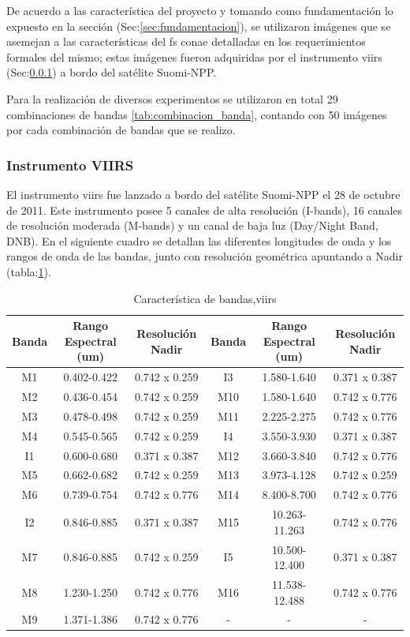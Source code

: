 De acuerdo a las característica del proyecto y tomando como fundamentación lo expuesto en la sección (Sec:\ref{sec:fundamentacion}), se utilizaron imágenes que se asemejan a las características del \ac{fs} \ac{conae} detalladas en los requerimientos formales del mismo; estas imágenes fueron adquiridas por el instrumento \ac{viirs} (Sec:\ref{sub:viirs}) a bordo del satélite Suomi-NPP.


Para la realización de diversos experimentos se utilizaron en total 29 combinaciones de bandas \ref{tab:combinacion_banda}, contando con 50 imágenes por cada combinación de bandas que se realizo.


\subsubsection{Instrumento VIIRS}\label{sub:viirs}
El instrumento \ac{viirs} fue lanzado a bordo del satélite Suomi-NPP el 28 de octubre de 2011. Este instrumento posee 5 canales de alta resolución (I-bands), 16 canales de resolución moderada (M-bands) y un canal de baja luz (Day/Night Band, DNB).  En el siguiente cuadro se detallan las diferentes longitudes de onda y los rangos de onda de las bandas, junto con resolución geométrica apuntando a Nadir (tabla:\ref{tab:viirs}).
\begin{table}[H]
\begin{center}
\begin{tabular}{|c|c|c||c|c|c|}
\hline \textbf{Banda} & Rango Espectral (um) & Resolución Nadir & \textbf{Banda} & Rango Espectral (um) & Resolución Nadir \\\hline 
 		M1  & 0.402-0.422   & 0.742 x 0.259 & I3  & 1.580-1.640   & 0.371 x 0.387 \\ \hline 
		M2  & 0.436-0.454   & 0.742 x 0.259 & M10 & 1.580-1.640   & 0.742 x 0.776 \\ \hline 
		M3  & 0.478-0.498   & 0.742 x 0.259 & M11 & 2.225-2.275   & 0.742 x 0.776 \\ \hline 
		M4  & 0.545-0.565   & 0.742 x 0.259 & I4  & 3.550-3.930   & 0.371 x 0.387 \\ \hline 
		I1  & 0.600-0.680   & 0.371 x 0.387 & M12 & 3.660-3.840   & 0.742 x 0.776 \\ \hline 
		M5  & 0.662-0.682   & 0.742 x 0.259 & M13 & 3.973-4.128   & 0.742 x 0.259 \\ \hline 
		M6  & 0.739-0.754   & 0.742 x 0.776 & M14 & 8.400-8.700   & 0.742 x 0.776 \\ \hline 
		I2  & 0.846-0.885   & 0.371 x 0.387 & M15 & 10.263-11.263 & 0.742 x 0.776 \\ \hline 
		M7  & 0.846-0.885   & 0.742 x 0.259 & I5  & 10.500-12.400 & 0.371 x 0.387 \\ \hline 
		M8  & 1.230-1.250   & 0.742 x 0.776 & M16 & 11.538-12.488 & 0.742 x 0.776 \\ \hline 
		M9  & 1.371-1.386   & 0.742 x 0.776 & - &-&- \\ \hline 
\end{tabular}
\end{center}\caption{Característica de bandas,\ac{viirs} \label{tab:viirs}}
\end{table}

